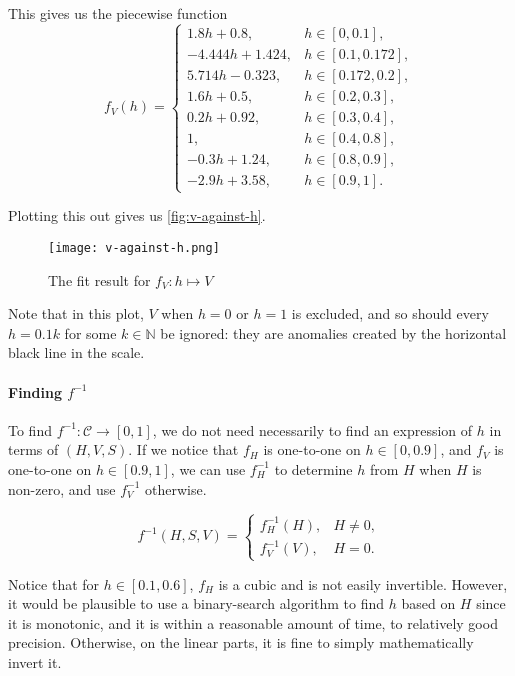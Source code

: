 This gives us the piecewise function
\[
    f_V(h) = \begin{cases}
        1.8h + 0.8,      & h \in [0, 0.1],     \\
        -4.444h + 1.424, & h \in [0.1, 0.172], \\
        5.714h - 0.323,  & h \in [0.172, 0.2], \\
        1.6h + 0.5,      & h \in [0.2, 0.3],   \\
        0.2h + 0.92,     & h \in [0.3, 0.4],   \\
        1,               & h \in [0.4, 0.8],   \\
        -0.3h + 1.24,    & h \in [0.8, 0.9],   \\
        -2.9h + 3.58,    & h \in [0.9, 1].
    \end{cases}
\]

Plotting this out gives us \autoref{fig:v-against-h}.

\begin{figure}[htp]
    \centering
    \texttt{[image: v-against-h.png]}
    \caption{The fit result for \(f_V: h \mapsto V\)}
    \label{fig:v-against-h}
\end{figure}

Note that in this plot, \(V\) when \(h = 0\) or \(h = 1\) is excluded, and so should every \(h = 0.1 k\) for some \(k \in \mathbb{N}\) be ignored: they are anomalies created by the horizontal black line in the scale.

\paragraph{Finding \(f^{-1}\)}

To find \(f^{-1}: \mathcal{C} \to [0, 1]\), we do not need necessarily to find an expression of \(h\) in terms of \((H, V, S)\). If we notice that \(f_H\) is one-to-one on \(h \in [0, 0.9]\), and \(f_V\) is one-to-one on \(h \in [0.9, 1]\), we can use \(f_H^{-1}\) to determine \(h\) from \(H\) when \(H\) is non-zero, and use \(f_V^{-1}\) otherwise.

\[
    f^{-1}(H, S, V) = \begin{cases}
        f_H^{-1}(H), & H \neq 0, \\
        f_V^{-1}(V), & H = 0.
    \end{cases}
\]

Notice that for \(h \in [0.1, 0.6]\), \(f_H\) is a cubic and is not easily invertible. However, it would be plausible to use a binary-search algorithm to find \(h\) based on \(H\) since it is monotonic, and it is within a reasonable amount of time, to relatively good precision. Otherwise, on the linear parts, it is fine to simply mathematically invert it.

